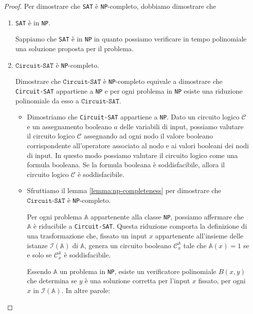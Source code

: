 \begin{proof}
    Per dimostrare che \texttt{SAT} è \texttt{NP}-completo, dobbiamo dimostrare che
    \begin{enumerate}
        \item \texttt{SAT} è in \texttt{NP}.

            Sappiamo che \texttt{SAT} è in \texttt{NP} in quanto
            possiamo verificare in tempo polinomiale una soluzione proposta per il problema.
        \item $\texttt{Circuit-SAT}$ è \texttt{NP}-completo.
            
        Dimostrare che $\texttt{Circuit-SAT}$ è \texttt{NP}-completo equivale a dimostrare
            che \texttt{Circuit-SAT} appartiene a \texttt{NP}
            e per ogni problema in \texttt{NP} esiste una riduzione polinomiale da esso a
            $\texttt{Circuit-SAT}$.
            \begin{itemize}
                \item Dimostriamo che \texttt{Circuit-SAT} appartiene a \texttt{NP}. Dato un circuito logico
                    $\mathcal{C}$ e un assegnamento booleano $a$ delle variabili di input, possiamo valutare
                    il circuito logico $\mathcal{C}$ assegnando ad ogni nodo il valore booleano corrispondente
                    all'operatore associato al nodo e ai valori booleani dei nodi di input. In questo modo
                    possiamo valutare il circuito logico come una formula booleana. Se la formula booleana
                    è soddisfacibile, allora il circuito logico $\mathcal{C}$ è soddisfacibile.
                \item Sfruttiamo il lemma \ref{lemma:np-completeness} per dimostrare che $\texttt{Circuit-SAT}$ è
                    \texttt{NP}-completo.

                    Per ogni problema \( \mathbb{A} \) appartenente alla classe \texttt{NP}, possiamo
                    affermare
                    che \( \mathbb{A} \) è riducibile a \texttt{Circuit-SAT}. Questa riduzione comporta la
                    definizione di una trasformazione che, fissato un input \( x \) appartenente all'insieme
                    delle istanze \( \mathcal{I}(\mathbb{A}) \) di \( \mathbb{A} \), genera un circuito
                    booleano \( \mathcal{C}^{\mathbb{A}}_x \) tale che \( \mathbb{A}(x) = 1 \) se e solo
                    se \( \mathcal{C}^{\mathbb{A}}_x \) è soddisfacibile.

                    Essendo \( \mathbb{A} \) un problema in \texttt{NP}, esiste un verificatore
                    polinomiale \( B(x,y) \) che determina se \( y \) è una soluzione corretta per
                    l'input \( x \) fissato, per ogni \( x \) in \( \mathcal{I}(\mathbb{A}) \). In altre parole:


\end{itemize}
\end{enumerate}
\end{proof}

